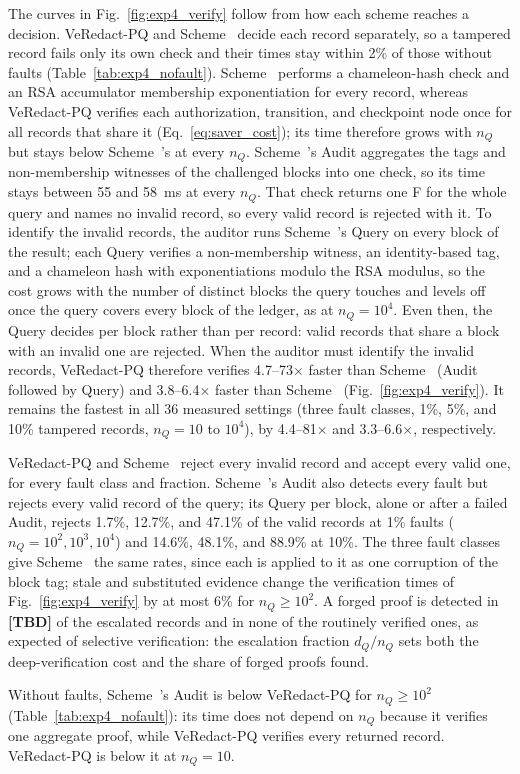 \documentclass[lettersize,journal]{IEEEtran}
\begin{document}
{The curves in Fig.~\ref{fig:exp4_verify} follow from how each scheme
reaches a decision. VeRedact-PQ and Scheme~\cite{ref1} decide each
record separately, so a tampered record fails only its own check and
their times stay within 2\% of those without faults
(Table~\ref{tab:exp4_nofault}). Scheme~\cite{ref1} performs a
chameleon-hash check and an RSA accumulator membership exponentiation
for every record, whereas VeRedact-PQ verifies each authorization,
transition, and checkpoint node once for all records that share it
(Eq.~\eqref{eq:saver_cost}); its time therefore grows with $n_Q$ but
stays below Scheme~\cite{ref1}'s at every $n_Q$.
Scheme~\cite{ref13}'s Audit aggregates the tags and non-membership
witnesses of the challenged blocks into one check, so its time stays
between 55 and 58~ms at every $n_Q$. That check returns one F for
the whole query and names no invalid record, so every valid record is
rejected with it. To identify the invalid records, the auditor runs
Scheme~\cite{ref13}'s Query on every block of the result; each Query
verifies a non-membership witness, an identity-based tag, and a
chameleon hash with exponentiations modulo the RSA modulus, so the cost
grows with the number of distinct blocks the query touches and levels
off once the query covers every block of the ledger, as at $n_Q=10^4$.
Even then, the Query decides per block rather than per record: valid
records that share a block with an invalid one are rejected.
When the auditor must identify the invalid records, VeRedact-PQ
therefore verifies 4.7--73$\times$ faster than Scheme~\cite{ref13}
(Audit followed by Query) and 3.8--6.4$\times$ faster than
Scheme~\cite{ref1} (Fig.~\ref{fig:exp4_verify}). It remains the fastest
in all 36 measured settings (three fault classes, 1\%, 5\%, and 10\%
tampered records, $n_Q=10$ to $10^4$), by 4.4--81$\times$ and
3.3--6.6$\times$, respectively.

VeRedact-PQ and Scheme~\cite{ref1} reject every invalid record and
accept every valid one, for every fault class and fraction.
Scheme~\cite{ref13}'s Audit also detects every fault but rejects every
valid record of the query; its Query per block, alone or after a failed
Audit, rejects 1.7\%, 12.7\%, and 47.1\% of the valid records at 1\%
faults ($n_Q=10^2,10^3,10^4$) and 14.6\%, 48.1\%, and 88.9\% at 10\%.
The three fault classes give Scheme~\cite{ref13} the same rates, since
each is applied to it as one corruption of the block tag; stale and
substituted evidence change the verification times of
Fig.~\ref{fig:exp4_verify} by at most 6\% for $n_Q\geq10^2$. A forged proof
is detected in \textbf{[TBD]} of the escalated records and in none of
the routinely verified ones, as expected of selective verification: the
escalation fraction $d_Q/n_Q$ sets both the deep-verification cost and
the share of forged proofs found.

Without faults, Scheme~\cite{ref13}'s Audit is below VeRedact-PQ for
$n_Q\geq10^2$ (Table~\ref{tab:exp4_nofault}): its time does not depend
on $n_Q$ because it verifies one aggregate proof, while VeRedact-PQ
verifies every returned record. VeRedact-PQ is below it at $n_Q=10$.}
\end{document}
